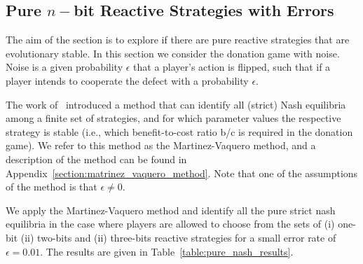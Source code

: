 \documentclass{article}
\theoremstyle{definition}
\begin{document}
\subsection{Pure \(n-\)bit Reactive Strategies with Errors}\label{section:pure_strategies}

The aim of the section is to explore if there are pure reactive strategies that
are evolutionary stable. In this section we consider the donation game with
noise. Noise is a given probability \(\epsilon\) that a player's action is
flipped, such that if a player intends to cooperate the defect with a
probability \(\epsilon\).

The work of~\citep{hilbe:PNAS:2017} introduced a method that can identify all
(strict) Nash equilibria among a finite set of strategies, and for which
parameter values the respective strategy is stable (i.e., which benefit-to-cost
ratio b/c is required in the donation game). We refer to this method as the
Martinez-Vaquero method, and a description of the method can be found in
Appendix~\ref{section:matrinez_vaquero_method}. Note that one of the assumptions
of the method is that \(\epsilon \neq 0\).

We apply the Martinez-Vaquero method and identify all the pure strict nash
equilibria in the case where players are allowed to choose from the sets of (i)
one-bit (ii) two-bits and (ii) three-bits reactive strategies for a small error
rate of \(\epsilon=0.01\). The results are given in
Table~\ref{table:pure_nash_results}.
\end{document}
